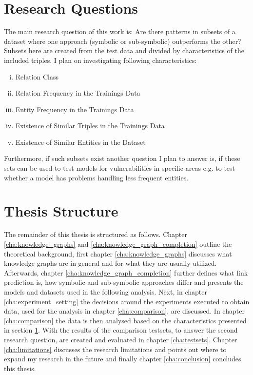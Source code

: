 \section{Research Questions}
\label{sec:research_questions}
The main research question of this work is: Are there patterns in subsets of a dataset where one approach (symbolic or sub-symbolic) outperforms the other? 
Subsets here are created from the test data and divided by characteristics of the included triples. I plan on investigating following characteristics:

\begin{enumerate}[(i)]
\item Relation Class
\item Relation Frequency in the Trainings Data
\item Entity Frequency in the Trainings Data
\item Existence of Similar Triples in the Trainings Data
\item Existence of Similar Entities in the Dataset
\end{enumerate}

Furthermore, if such subsets exist another question I plan to answer is, if these sets can be used to test models for vulnerabilities in specific areas e.g. to test whether a model has problems handling less frequent entities. 

\section{Thesis Structure}
The remainder of this thesis is structured as follows. Chapter \ref{cha:knowledge_graphs} and \ref{cha:knowledge_graph_completion} outline the theoretical background, first chapter \ref{cha:knowledge_graphs} discusses what knowledge graphs are in general and for what they are usually utilized. Afterwards, chapter \ref{cha:knowledge_graph_completion} further defines what link prediction is, how symbolic and sub-symbolic approaches differ and presents the models and datasets used in the following analysis. Next, in chapter \ref{cha:experiment_setting} the decisions around the experiments executed to obtain data, used for the analysis in chapter \ref{cha:comparison}, are discussed. In chapter \ref{cha:comparison} the data is then analysed based on the characteristics presented in section \ref{sec:research_questions}. With the results of the comparison testsets, to answer the second research question, are created and evaluated in chapter \ref{cha:testsets}. Chapter \ref{cha:limitations} discusses the research limitations and points out where to expand my research in the future and finally chapter \ref{cha:conclusion} concludes this thesis.